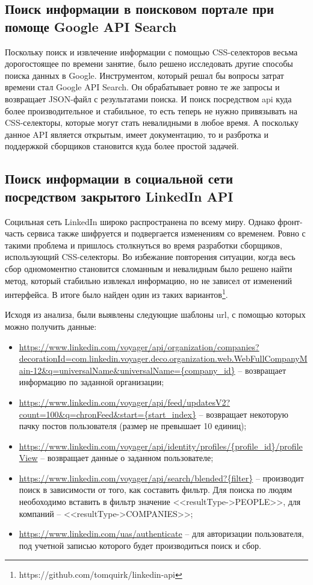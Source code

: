 \subsection{Поиск информации в поисковом портале при помоще Google API Search}
Поскольку поиск и извлечение информации с помощью CSS-селекторов весьма дорогостоящее по времени занятие, было решено 
исследовать другие способы поиска данных в Google. Инструментом, который решал бы вопросы затрат времени стал Google API Search.
Он обрабатывает ровно те же запросы и возвращает JSON-файл с результатами поиска. И поиск посредством api куда более производительное
и стабильное, то есть теперь не нужно привязывать на CSS-селекторы, которые могут стать невалидными в любое время. А поскольку
данное API является открытым, имеет документацию, то и разбротка и поддержкой сборщиков становится куда более простой задачей.

\subsection{Поиск информации в социальной сети посредством закрытого LinkedIn API}
Социльная сеть LinkedIn широко распространена по всему миру. Однако фронт-часть сервиса также шифруется и подвергается изменениям
со временем. Ровно с такими проблема и пришлось столкнуться во время разработки сборщиков, использующий CSS-селекторы. Во избежание
повторения ситуации, когда весь сбор одномоментно становится сломанным и невалидным было решено найти метод, который стабильно
 извлекал информацию, но не зависел от изменений интерфейса. В итоге было найден один из таких вариантов\footnote{https://github.com/tomquirk/linkedin-api}.
\par
Исходя из анализа, были выявлены следующие шаблоны url, с помощью которых можно получить данные:
\begin{itemize}
    \item \url{https://www.linkedin.com/voyager/api/organization/companies?decorationId=com.linkedin.voyager.deco.organization.web.WebFullCompanyMain-12&q=universalName&universalName={company_id}} 
    -- возвращает информацию по заданной организации;
    \item \url{https://www.linkedin.com/voyager/api/feed/updatesV2?count=100&q=chronFeed&start={start_index}} -- возвращает некоторую пачку постов пользователя (размер не превышает 10 единиц);
    \item \url{https://www.linkedin.com/voyager/api/identity/profiles/{profile_id}/profileView} -- возвращает данные о заданном пользователе;
    \item \url{https://www.linkedin.com/voyager/api/search/blended?{filter}} -- производит поиск в зависимости от того, как составить фильтр. 
    Для поиска по людям необоходимо вставить в фильтр значение <<resultType->PEOPLE>>, для компаний -- <<resultType->COMPANIES>>;
    \item \url{https://www.linkedin.com/uas/authenticate} -- для авторизации пользователя, под учетной записью которого будет производиться поиск и сбор.
\end{itemize} 

